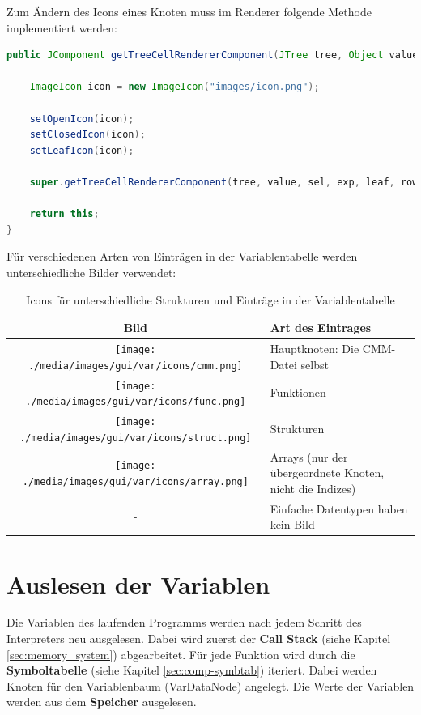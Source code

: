 Zum Ändern des Icons eines Knoten muss im Renderer folgende Methode implementiert werden:
\begin{lstlisting}[language=JAVA]
public JComponent getTreeCellRendererComponent(JTree tree, Object value, boolean sel, boolean exp, boolean leaf, int row, boolean hasFocus) {

	ImageIcon icon = new ImageIcon("images/icon.png");

	setOpenIcon(icon);
	setClosedIcon(icon);
	setLeafIcon(icon);
	
	super.getTreeCellRendererComponent(tree, value, sel, exp, leaf, row, hasFocus);
		
	return this;
}
\end{lstlisting}

Für verschiedenen Arten von Einträgen in der Variablentabelle werden unterschiedliche Bilder verwendet:
\def\arraystretch{1.4}
\begin{table}[h!]
\center
\begin{tabular}{|cl|}
\hline 
Bild & Art des Eintrages \\ 
\hline
\texttt{[image: ./media/images/gui/var/icons/cmm.png]} & Hauptknoten: Die CMM-Datei selbst \\
\texttt{[image: ./media/images/gui/var/icons/func.png]} & Funktionen \\
\texttt{[image: ./media/images/gui/var/icons/struct.png]} & Strukturen \\ 
\texttt{[image: ./media/images/gui/var/icons/array.png]} & Arrays (nur der übergeordnete Knoten, nicht die Indizes) \\ 
- & Einfache Datentypen haben kein Bild\\
\hline 
\end{tabular}
\caption{Icons für unterschiedliche Strukturen und Einträge in der Variablentabelle}
\end{table}

\section{Auslesen der Variablen}
Die Variablen des laufenden Programms werden nach jedem Schritt des Interpreters neu ausgelesen. Dabei wird zuerst der \textbf{Call Stack} (siehe Kapitel \ref{sec:memory_system}) abgearbeitet. Für jede Funktion wird durch die \textbf{Symboltabelle} (siehe Kapitel \ref{sec:comp-symbtab}) iteriert. Dabei werden Knoten für den Variablenbaum (VarDataNode) angelegt. Die Werte der Variablen werden aus dem \textbf{Speicher} ausgelesen.

